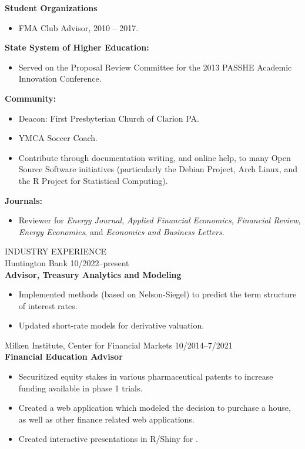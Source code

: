 \documentclass[9pt]{article}
\begin{document}
{\bf Student Organizations}
\begin{itemize}[noitemsep, nolistsep]
\item FMA Club Advisor, 2010 -- 2017.
\end{itemize}
{\bf State System of Higher Education:}
\begin{itemize}[noitemsep, nolistsep]
\item Served on the Proposal Review Committee for the 2013 PASSHE Academic Innovation Conference.
\end{itemize}
{\bf Community:}
\begin{itemize}[noitemsep, nolistsep]
\item Deacon: First Presbyterian Church of Clarion PA.
\item YMCA Soccer Coach.
\item Contribute through documentation writing, and online help, to many Open Source Software initiatives (particularly the Debian Project, Arch Linux, and the R Project for Statistical Computing).
\end{itemize}
{\bf Journals:}
\begin{itemize}[noitemsep, nolistsep]
\item Reviewer for {\it Energy Journal}, {\it Applied Financial Economics}, {\it Financial Review}, {\it Energy Economics}, and {\it Economics and Business Letters}.
\end{itemize}
\vspace{10pt}
INDUSTRY EXPERIENCE \\
Huntington Bank \hfill \hfill 10/2022--present\\
{\bf Advisor, Treasury Analytics and Modeling}
\begin{itemize}[noitemsep, nolistsep]
  \item Implemented methods (based on Nelson-Siegel) to predict the term structure of interest rates.
  \item Updated short-rate models for derivative valuation.
\end{itemize}
\vspace{5pt}
Milken Institute, Center for Financial Markets \hfill \hfill 10/2014--7/2021\\
{\bf Financial Education Advisor}
\begin{itemize}[noitemsep, nolistsep]
  \item Securitized equity stakes in various pharmaceutical patents to increase funding available in phase 1 trials.
  \item Created a web application which modeled the decision to purchase a house, as well as other finance related web applications. 
  \item Created interactive presentations in R/Shiny for {\color{Blue}{5MinuteFinance.org}}.
\end{itemize}
\end{document}
